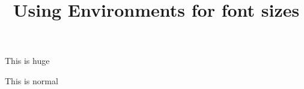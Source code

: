 \documentclass{article}
\begin{document}
	\title{Using Environments for font sizes}
	\maketitle
	\begin{huge}
		This is huge
	\end{huge}

	\bigskip
	This is normal
\end{document}
